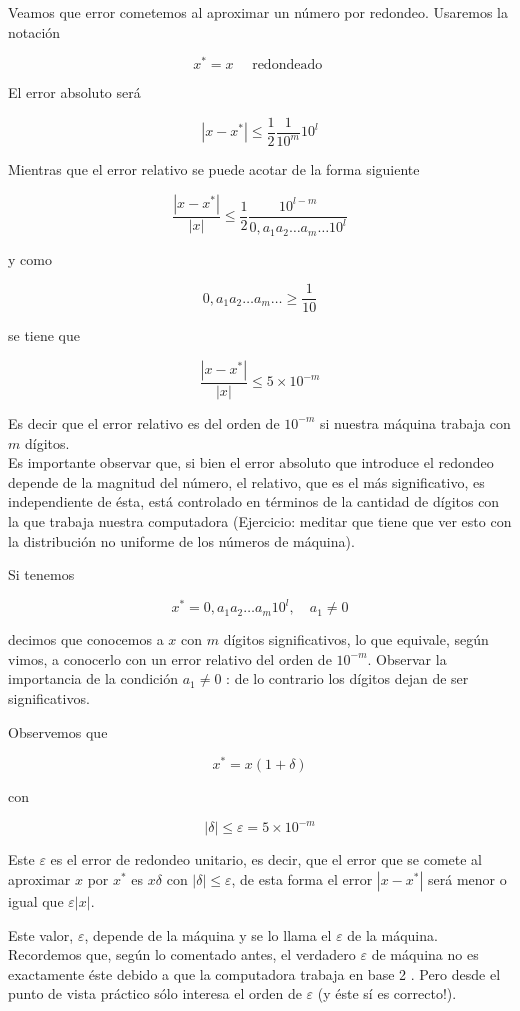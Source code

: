 \documentclass[10pt]{article}
\begin{document}
Veamos que error cometemos al aproximar un número por redondeo. Usaremos la notación

$$
x^{*}=x \quad \text { redondeado }
$$

El error absoluto será

$$
\left|x-x^{*}\right| \leq \frac{1}{2} \frac{1}{10^{m}} 10^{l}
$$

Mientras que el error relativo se puede acotar de la forma siguiente

$$
\frac{\left|x-x^{*}\right|}{|x|} \leq \frac{1}{2} \frac{10^{l-m}}{0, a_{1} a_{2} \ldots a_{m} \ldots 10^{l}}
$$

y como

$$
0, a_{1} a_{2} \ldots a_{m} \ldots \geq \frac{1}{10}
$$

se tiene que

$$
\frac{\left|x-x^{*}\right|}{|x|} \leq 5 \times 10^{-m}
$$

Es decir que el error relativo es del orden de $10^{-m}$ si nuestra máquina trabaja con $m$ dígitos.\\
Es importante observar que, si bien el error absoluto que introduce el redondeo depende de la magnitud del número, el relativo, que es el más significativo, es independiente de ésta, está controlado en términos de la cantidad de dígitos con la que trabaja nuestra computadora (Ejercicio: meditar que tiene que ver esto con la distribución no uniforme de los números de máquina).

Si tenemos

$$
x^{*}=0, a_{1} a_{2} \ldots a_{m} 10^{l}, \quad a_{1} \neq 0
$$

decimos que conocemos a $x$ con $m$ dígitos significativos, lo que equivale, según vimos, a conocerlo con un error relativo del orden de $10^{-m}$. Observar la importancia de la condición $a_{1} \neq 0$ : de lo contrario los dígitos dejan de ser significativos.

Observemos que

$$
x^{*}=x(1+\delta)
$$

con

$$
|\delta| \leq \varepsilon=5 \times 10^{-m}
$$

Este $\varepsilon$ es el error de redondeo unitario, es decir, que el error que se comete al aproximar $x$ por $x^{*}$ es $x \delta$ con $|\delta| \leq \varepsilon$, de esta forma el error $\left|x-x^{*}\right|$ será menor o igual que $\varepsilon|x|$.

Este valor, $\varepsilon$, depende de la máquina y se lo llama el $\varepsilon$ de la máquina. Recordemos que, según lo comentado antes, el verdadero $\varepsilon$ de máquina no es exactamente éste debido a que la computadora trabaja en base 2 . Pero desde el punto de vista práctico sólo interesa el orden de $\varepsilon$ (y éste sí es correcto!).
\end{document}
